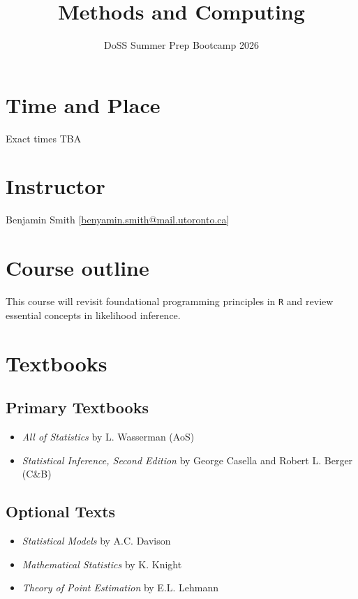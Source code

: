 \documentclass[
  11pt,
]{article}
\title{Methods and Computing}
\subtitle{DoSS Summer Prep Bootcamp 2026}
\author{}
\date{\vspace{-2.5em}}
\providecommand{\tightlist}{%
  \setlength{\itemsep}{0pt}\setlength{\parskip}{0pt}}
\begin{document}
\maketitle

\section{Time and Place}\label{time-and-place}

Exact times TBA

\section{Instructor}\label{instructor}

Benjamin Smith {[}\url{benyamin.smith@mail.utoronto.ca}{]}

\section{Course outline}\label{course-outline}

This course will revisit foundational programming principles in
\texttt{R} and review essential concepts in likelihood inference.

\section{Textbooks}\label{textbooks}

\subsection{Primary Textbooks}\label{primary-textbooks}

\begin{itemize}
\tightlist
\item
  \emph{All of Statistics} by L. Wasserman (AoS)
\item
  \emph{Statistical Inference, Second Edition} by George Casella and
  Robert L. Berger (C\&B)
\end{itemize}

\subsection{Optional Texts}\label{optional-texts}

\begin{itemize}
\tightlist
\item
  \emph{Statistical Models} by A.C. Davison
\item
  \emph{Mathematical Statistics} by K. Knight
\item
  \emph{Theory of Point Estimation} by E.L. Lehmann
\end{itemize}
\end{document}

